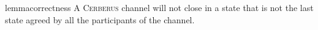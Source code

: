 \documentclass[runningheads]{llncs}
\newcommand{\ie}{{\em i.e.}}
\newcommand{\sys}{\textsc{Cerberus}\xspace}
\begin{document}
    

\vspace{-4pt}
\begin{restatable}{lemma}{correctness}\label{lem:correctness}
A \sys channel will not close in a state that is not the last state agreed by all the participants of the channel.
\end{restatable}
\end{document}
